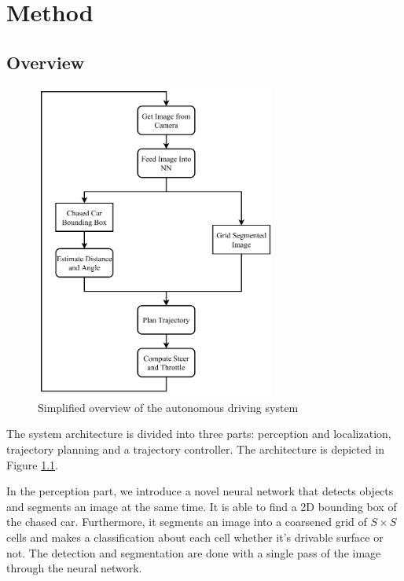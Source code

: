 \documentclass{ctuthesis/ctuthesis}
\begin{document}
\chapter{Method}\label{s:method}
\section{Overview}
\begin{figure}[]
    \centering
    \includegraphics[width=0.7\textwidth]{images/bachelor_diagram.pdf}
    \caption{Simplified overview of the autonomous driving system}\label{f:overview}
\end{figure}

The system architecture is divided into three parts: perception and localization, trajectory planning and a trajectory controller. The architecture is depicted in Figure \ref{f:overview}. \par


In the perception part, we introduce a novel neural network that detects objects and segments an image at the same time. It is able to find a 2D bounding box of the chased car. Furthermore, it segments an image into a coarsened grid of $S\times S$ cells and makes a classification about each cell whether it's drivable surface or not. The detection and segmentation are done with a single pass of the image through the neural network. \par
\end{document}

